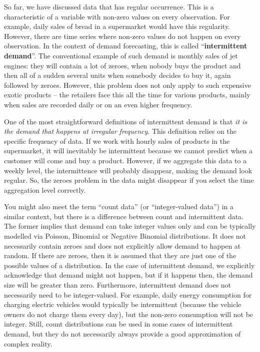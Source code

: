 \documentclass[]{book}
\theoremstyle{definition}
\theoremstyle{definition}
\theoremstyle{definition}
\theoremstyle{definition}
\theoremstyle{remark}
\begin{document}
So far, we have discussed data that has regular occurrence. This is a characteristic of a variable with non-zero values on every observation. For example, daily sales of bread in a supermarket would have this regularity. However, there are time series where non-zero values do not happen on every observation. In the context of demand forecasting, this is called ``\textbf{intermittent demand}''. The conventional example of such demand is monthly sales of jet engines: they will contain a lot of zeroes, when nobody buys the product and then all of a sudden several units when somebody decides to buy it, again followed by zeroes. However, this problem does not only apply to such expensive exotic products -- the retailers face this all the time for various products, mainly when sales are recorded daily or on an even higher frequency.

One of the most straightforward definitions of intermittent demand is that \emph{it is the demand that happens at irregular frequency}. This definition relies on the specific frequency of data. If we work with hourly sales of products in the supermarket, it will inevitably be intermittent because we cannot predict when a customer will come and buy a product. However, if we aggregate this data to a weekly level, the intermittence will probably disappear, making the demand look regular. So, the zeroes problem in the data might disappear if you select the time aggregation level correctly.

You might also meet the term ``count data'' (or ``integer-valued data'') in a similar context, but there is a difference between count and intermittent data. The former implies that demand can take integer values only and can be typically modelled via Poisson, Binomial or Negative Binomial distributions. It does not necessarily contain zeroes and does not explicitly allow demand to happen at random. If there are zeroes, then it is assumed that they are just one of the possible values of a distribution. In the case of intermittent demand, we explicitly acknowledge that demand might not happen, but if it happens then, the demand size will be greater than zero. Furthermore, intermittent demand does not necessarily need to be integer-valued. For example, daily energy consumption for charging electric vehicles would typically be intermittent (because the vehicle owners do not charge them every day), but the non-zero consumption will not be integer. Still, count distributions can be used in some cases of intermittent demand, but they do not necessarily always provide a good approximation of complex reality.
\end{document}
